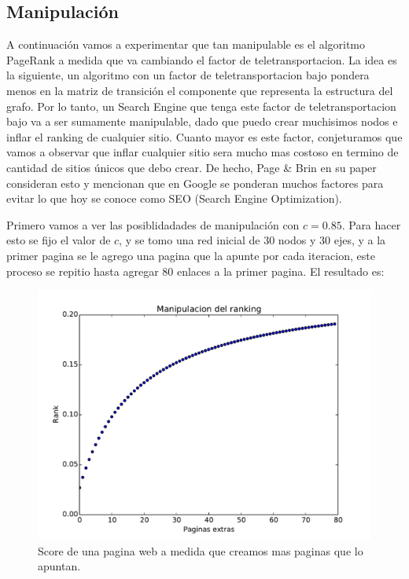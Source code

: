 \pagebreak
\subsection{Manipulación}

A continuación vamos a experimentar que tan manipulable es el algoritmo PageRank a medida que va cambiando el factor de teletransportacion. La idea es la siguiente, un algoritmo con un factor de teletransportacion bajo pondera menos en la matriz de transición el componente que representa la estructura del grafo. Por lo tanto, un Search Engine que tenga este factor de teletransportacion bajo va a ser sumamente manipulable, dado que puedo crear muchisimos nodos e inflar el ranking de cualquier sitio. Cuanto mayor es este factor, conjeturamos que vamos a observar que inflar cualquier sitio sera mucho mas costoso en termino de cantidad de sitios únicos que debo crear. De hecho, Page \& Brin en su paper consideran esto y mencionan que en Google se ponderan muchos factores para evitar lo que hoy se conoce como SEO (Search Engine Optimization).

Primero vamos a ver las posiblidadades de manipulación con $c = 0.85$. Para hacer esto se fijo el valor de $c$, y se tomo una red inicial de 30 nodos y 30 ejes, y a la primer pagina se le agrego una pagina que la apunte por cada iteracion, este proceso se repitio hasta agregar 80 enlaces a la primer pagina. El resultado es:

\begin{figure}[H]
\centering
\includegraphics[scale=0.7]{images/manipulacion.pdf}
\caption{Score de una pagina web a medida que creamos mas paginas que lo apuntan.}
\label{timePageRank}
\end{figure}


